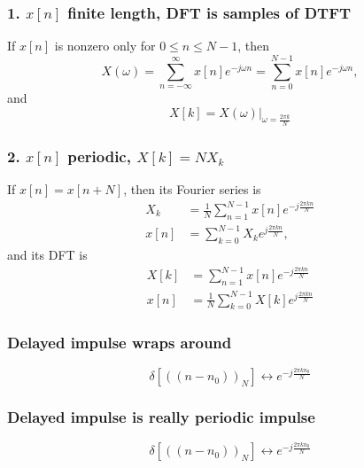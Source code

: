 \documentclass{beamer}
\begin{document}
\begin{frame}
  \frametitle{1. $x[n]$ finite length, DFT is samples of DTFT}

  If $x[n]$ is nonzero only for $0\le n\le N-1$, then
  \begin{displaymath}
    X(\omega) = \sum_{n=-\infty}^\infty x[n]e^{-j\omega n}
    = \sum_{n=0}^{N-1} x[n]e^{-j\omega n},
  \end{displaymath}
  and
  \begin{displaymath}
    X[k] = \left. X(\omega)\right|_{\omega=\frac{2\pi k}{N}}
  \end{displaymath}
  
\end{frame}

\begin{frame}
  \frametitle{2. $x[n]$ periodic, $X[k]=NX_k$}

  If $x[n]=x[n+N]$, then its Fourier series is
  \begin{align*}
    X_k &= \frac{1}{N}\sum_{n=1}^{N-1} x[n]e^{-j\frac{2\pi kn}{N}}\\
    x[n] &= \sum_{k=0}^{N-1} X_k e^{j\frac{2\pi kn}{N}},
  \end{align*}
  and its DFT is
  \begin{align*}
    X[k] &= \sum_{n=1}^{N-1} x[n]e^{-j\frac{2\pi kn}{N}}\\
    x[n] &= \frac{1}{N}\sum_{k=0}^{N-1} X[k] e^{j\frac{2\pi kn}{N}}
  \end{align*}
\end{frame}
  
\begin{frame}
  \frametitle{Delayed impulse wraps around}

  \begin{displaymath}
    \delta\left[(\!(n-n_0)\!)_N\right] \leftrightarrow e^{-j\frac{2\pi kn_0}{N}}
  \end{displaymath}
  
  \centerline{}

\end{frame}

\begin{frame}
  \frametitle{Delayed impulse is really periodic impulse}

  \begin{displaymath}
    \delta\left[(\!(n-n_0)\!)_N\right] \leftrightarrow e^{-j\frac{2\pi kn_0}{N}}
  \end{displaymath}
  
  \centerline{}

\end{frame}
\end{document}
